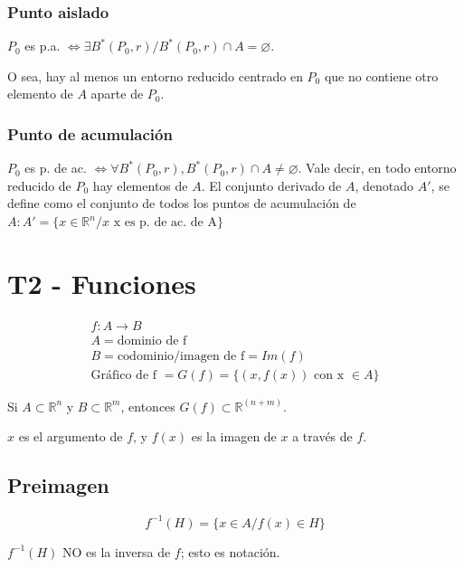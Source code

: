 \documentclass{article}
\renewcommand{\Bbb}{\mathbb}
\begin{document}
\subsubsection{Punto aislado}

$P_0$ es p.a. $\Longleftrightarrow \exists B^*(P_0, r) / B^*(P_0, r) \cap A = \varnothing$.

O sea, hay al menos un entorno reducido centrado en $P_0$ que no contiene otro elemento de $A$ aparte de $P_0$.

\subsubsection{Punto de acumulación}

$P_0$ es p. de ac. $\Longleftrightarrow \forall B^*(P_0, r), B^*(P_0, r) \cap A \neq \varnothing$.
Vale decir, en todo entorno reducido de $P_0$ hay elementos de $A$. El conjunto derivado de $A$, denotado $A'$, se define como el conjunto de todos los puntos de acumulación de $A: A' = \{ x \in \Bbb R^n / x \text{ x es p. de ac. de A} \}$

\section{T2 - Funciones}

\begin{subequations}
\begin{align}
f: A \rightarrow B \\
A = \text{dominio de f} \\
B = \text{codominio/imagen de f} = Im(f) \\
\text{Gráfico de f } = G(f) = \{ (x, f(x)) \text{ con x } \in A \}
\end{align}
\end{subequations}

Si $A \subset \Bbb R^n$ y $B \subset \Bbb R^m$, entonces $G(f) \subset \Bbb R^(n+m)$.

$x$ es el argumento de $f$, y $f(x)$ es la imagen de $x$ a través de $f$.

\subsection{Preimagen}

\begin{equation}
f^{-1}(H) = \{ x \in A / f(x) \in H \}
\end{equation}

$f^{-1}(H)$ NO es la inversa de $f$; esto es notación.
\end{document}
